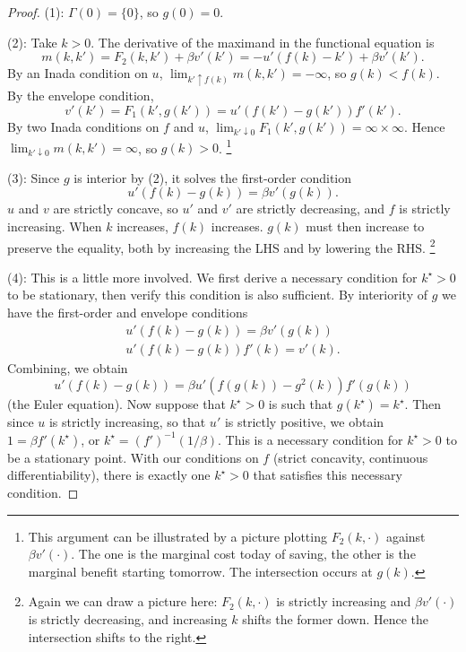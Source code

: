 \documentclass[11pt,letterpaper,reqno,oneside]{article}
\begin{document}
\begin{proof}
	(1): $\Gamma(0) = \{0\}$, so $g(0)=0$.

	(2): Take $k>0$. The derivative of the maximand in the functional equation is
	\begin{equation*}
		m(k,k') = F_2(k,k') + \beta v'(k') 
		= -u'( f(k) - k' ) + \beta v'(k') .
	\end{equation*}
	By an Inada condition on $u$, $\lim_{k' \uparrow f(k) } m(k,k') = -\infty$, so $g(k)<f(k)$. By the envelope condition,
	\begin{equation*}
		v'(k') = F_1(k',g(k')) 
		= u'( f(k') - g(k') ) f'(k') .
	\end{equation*}
	By two Inada conditions on $f$ and $u$, $\lim_{k' \downarrow 0} F_1(k',g(k')) = \infty \times \infty$. Hence $\lim_{k' \downarrow 0} m(k,k') = \infty$, so $g(k)>0$.%
		\footnote{This argument can be illustrated by a picture plotting $F_2(k,\cdot)$ against $\beta v'(\cdot)$. The one is the marginal cost today of saving, the other is the marginal benefit starting tomorrow. The intersection occurs at $g(k)$.}

	(3): Since $g$ is interior by (2), it solves the first-order condition
	\begin{equation*}
		u'( f(k) - g(k) ) = \beta v'(g(k)) .
	\end{equation*}
	$u$ and $v$ are strictly concave, so $u'$ and $v'$ are strictly decreasing, and $f$ is strictly increasing. When $k$ increases, $f(k)$ increases. $g(k)$ must then increase to preserve the equality, both by increasing the LHS and by lowering the RHS.%
		\footnote{Again we can draw a picture here: $F_2(k,\cdot)$ is strictly increasing and $\beta v'(\cdot)$ is strictly decreasing, and increasing $k$ shifts the former down. Hence the intersection shifts to the right.}

	(4): This is a little more involved. We first derive a necessary condition for $k^\star>0$ to be stationary, then verify this condition is also sufficient. By interiority of $g$ we have the first-order and envelope conditions
	\begin{gather*}
		u'( f(k) - g(k) ) = \beta v'(g(k))
		\\
		u'( f(k) - g(k) ) f'(k) = v'(k) .
	\end{gather*}
	Combining, we obtain
	\begin{equation*}
		u'( f(k) - g(k) ) 
		= \beta u'( f(g(k)) - g^2(k) ) f'(g(k)) 
	\end{equation*}
	(the Euler equation). Now suppose that $k^\star>0$ is such that $g(k^\star)=k^\star$. Then since $u$ is strictly increasing, so that $u'$ is strictly positive, we obtain $1 = \beta f'(k^\star)$, or $k^\star = (f')^{-1}(1/\beta)$. This is a necessary condition for $k^\star>0$ to be a stationary point. With our conditions on $f$ (strict concavity, continuous differentiability), there is exactly one $k^\star>0$ that satisfies this necessary condition.


\end{proof}
\end{document}

